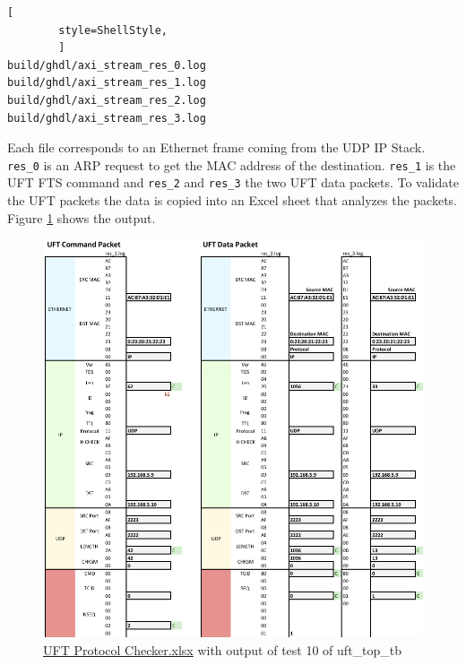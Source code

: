 \vspace{1em}
\begin{minipage}{\linewidth}
    \begin{lstlisting}[
        style=ShellStyle, 
        ]
build/ghdl/axi_stream_res_0.log
build/ghdl/axi_stream_res_1.log
build/ghdl/axi_stream_res_2.log
build/ghdl/axi_stream_res_3.log\end{lstlisting}
\end{minipage}
\vspace{1em}

Each file corresponds to an Ethernet frame coming from the UDP IP Stack. 
\texttt{res\_0} is an ARP request to get the MAC address of the destination.
\texttt{res\_1} is the UFT FTS command and \texttt{res\_2} and \texttt{res\_3}
the two UFT data packets. To validate the UFT packets the data is copied into an
Excel sheet that analyzes the packets. Figure \ref{fig:uftcheck} shows the
output.

\begin{figure}[b!]
    \centering
    \includegraphics[width=\textwidth] {images/validation/uftcheck.png}
    \caption{\url{UFT Protocol Checker.xlsx} with output of test 10 of
    uft\_top\_tb}
    \label{fig:uftcheck}
\end{figure}

